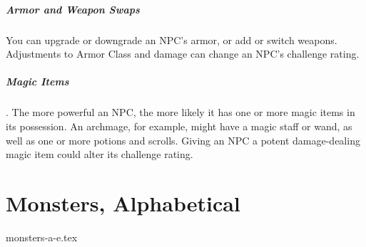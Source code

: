 \subparagraph*{Armor and Weapon Swaps} You can upgrade or downgrade an NPC's armor, or add or switch weapons. Adjustments to Armor Class and damage can change an NPC's challenge rating.

\subparagraph*{Magic Items}. The more powerful an NPC, the more likely it has one or more magic items in its possession. An archmage, for example, might have a magic staff or wand, as well as one or more potions and scrolls. Giving an NPC a potent damage-dealing magic item could alter its challenge rating.

\section{Monsters, Alphabetical}
{monsters-a-e.tex}